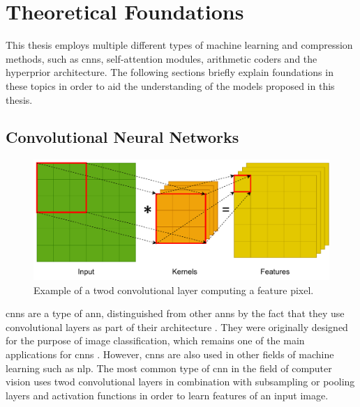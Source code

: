 \chapter{Theoretical Foundations\label{cha:chapter3}}
This thesis employs multiple different types of machine learning and compression methods, such as \acp{cnn}, self-attention modules, arithmetic coders and the hyperprior architecture. The following sections briefly explain foundations in these topics in order to aid the understanding of the models proposed in this thesis.
\section{Convolutional Neural Networks}
\begin{figure}[t]
\centering
\includegraphics[scale=0.8]{CNN.pdf}
\caption[Example of convolutional layer]{Example of a \ac{twod} convolutional layer computing a feature pixel.}
\label{fig:cnn}
\end{figure}

\Acp{cnn} are a type of \ac{ann}, distinguished from other \acp{ann} by the fact that they use convolutional layers as part of their architecture \citep{oshea_introduction_2015}. They were originally designed for the purpose of image classification, which remains one of the main applications for \acp{cnn} \citep{gu_recent_2018}. However, \acp{cnn} are also used in other fields of machine learning such as \ac{nlp}. The most common type of \ac{cnn} in the field of computer vision uses \ac{twod} convolutional layers in combination with subsampling or pooling layers and activation functions in order to learn features of an input image. 

